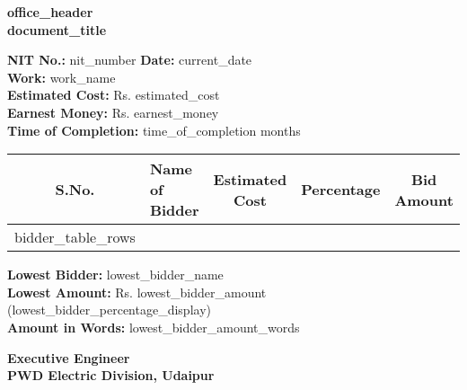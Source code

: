 \documentclass[12pt,a4paper]{article}
\begin{document}
\begin{center}
\textbf{{{office_header}}}\\[0.3cm]
\textbf{{{document_title}}}\\[0.2cm]
\end{center}

\vspace{0.5cm}

\noindent
\textbf{NIT No.:} {{nit_number}} \hfill \textbf{Date:} {{current_date}}\\
\textbf{Work:} {{work_name}}\\
\textbf{Estimated Cost:} Rs. {{estimated_cost}}\\
\textbf{Earnest Money:} Rs. {{earnest_money}}\\
\textbf{Time of Completion:} {{time_of_completion}} months

\vspace{0.5cm}

\begin{longtable}{|c|p{4cm}|c|c|c|}
\hline
\textbf{S.No.} & \textbf{Name of Bidder} & \textbf{Estimated Cost} & \textbf{Percentage} & \textbf{Bid Amount} \\
\hline
{{bidder_table_rows}}
\hline
\end{longtable}

\vspace{0.5cm}

\noindent
\textbf{Lowest Bidder:} {{lowest_bidder_name}}\\
\textbf{Lowest Amount:} Rs. {{lowest_bidder_amount}} ({{lowest_bidder_percentage_display}})\\
\textbf{Amount in Words:} {{lowest_bidder_amount_words}}

\vspace{1cm}

\noindent
\textbf{Executive Engineer}\\
\textbf{PWD Electric Division, Udaipur}
\end{document}
